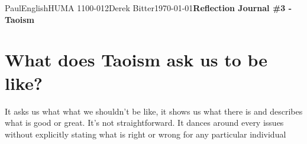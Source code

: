 \documentclass[12pt,letterpaper]{article}
\begin{document}
\begin{mla}{Paul}{English}{HUMA 1100-012}{Derek Bitter}{\today}{\textbf{Reflection Journal \#3 - Taoism}}

\section{What does Taoism ask us to be like?}








  
  
  




It asks us what what we shouldn't be like, it shows us what there is
and describes what is good or great. It's not straightforward. It
dances around every issues without explicitly stating what is right or
wrong for any particular individual
  
  



\end{mla}
\end{document}
